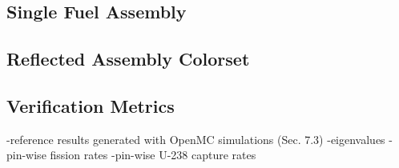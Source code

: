 \subsection{Single Fuel Assembly}
\label{subsubsec:benchmarks-assm}

\subsection{Reflected Assembly Colorset}
\label{subsubsec:benchmarks-2x2}



\subsection{Verification Metrics}
\label{subsec:metrics}

-reference results generated with OpenMC simulations (Sec. 7.3)
-eigenvalues
-pin-wise fission rates
-pin-wise U-238 capture rates

